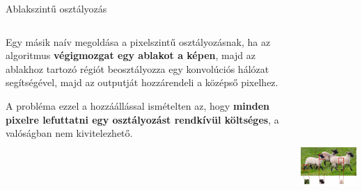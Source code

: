 \documentclass[english, aspectratio=169]{beamer}
\begin{document}
\begin{frame}{Ablakszintű osztályozás}
\begin{columns}
\begin{column}{.4\textwidth}
Egy másik naív megoldása a pixelszintű osztályozásnak, ha az algoritmus \textbf{végigmozgat egy ablakot a képen}, majd az ablakhoz tartozó régiót beosztályozza egy konvolúciós hálózat segítségével, majd az outputját hozzárendeli a középső pixelhez.\par\smallskip
A probléma ezzel a hozzáállással ismételten az, hogy \textbf{minden pixelre lefuttatni egy osztályozást rendkívül költséges}, a valóságban nem kivitelezhető.
\end{column}
\begin{column}{.6\textwidth}
\begin{center}
\includegraphics[height=10cm, width=8cm, keepaspectratio]{images/instance_8.png}
\end{center}
\end{column}
\end{columns}
\end{frame}
\end{document}
